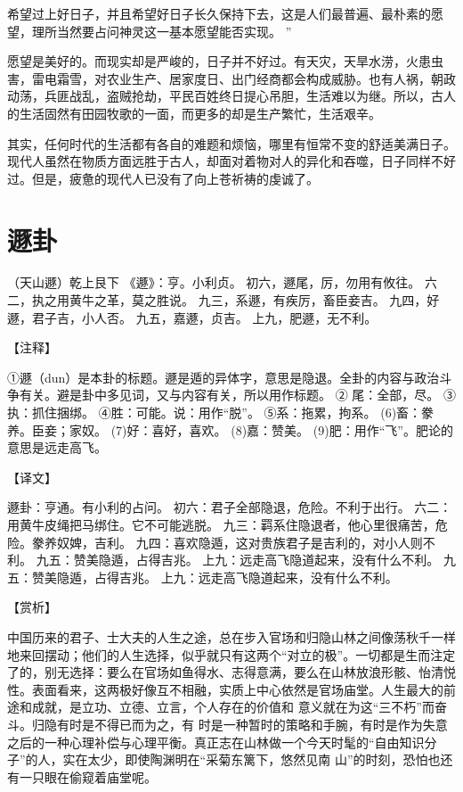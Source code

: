 \documentclass[12pt,UTF8]{ctexbook}
\begin{document}
希望过上好日子，并且希望好日子长久保持下去，这是人们最普遍、最朴素的愿望，理所当然要占问神灵这一基本愿望能否实现。 ”

愿望是美好的。而现实却是严峻的，日子并不好过。有天灾，天旱水涝，火患虫害，雷电霜雪，对农业生产、居家度日、出门经商都会构成威胁。也有人祸，朝政动荡，兵匪战乱，盗贼抢劫，平民百姓终日提心吊胆，生活难以为继。所以，古人的生活固然有田园牧歌的一面，而更多的却是生产繁忙，生活艰辛。

其实，任何时代的生活都有各自的难题和烦恼，哪里有恒常不变的舒适美满日子。现代人虽然在物质方面远胜于古人，却面对着物对人的异化和吞噬，日子同样不好过。但是，疲惫的现代人已没有了向上苍祈祷的虔诚了。

\chapter{遯卦}

（天山遯）乾上艮下
《遯》：亨。小利贞。
初六，遯尾，厉，勿用有攸往。
六二，执之用黄牛之革，莫之胜说。
九三，系遯，有疾厉，畜臣妾吉。
九四，好遯，君子吉，小人否。
九五，嘉遯，贞吉。
上九，肥遯，无不利。

【注释】

①遯（dun）是本卦的标题。遯是遁的异体字，意思是隐退。全卦的内容与政治斗争有关。避是卦中多见词，又与内容有关，所以用作标题。
② 尾：全部，尽。
③执：抓住捆绑。
④胜：可能。说：用作“脱”。
⑤系：拖累，拘系。
(6)畜：豢养。臣妾；家奴。
(7)好：喜好，喜欢。
(8)嘉：赞美。
(9)肥：用作“飞”。肥论的意思是远走高飞。

【译文】

遯卦：亨通。有小利的占问。
初六：君子全部隐退，危险。不利于出行。
六二：用黄牛皮绳把马绑住。它不可能逃脱。
九三：羁系住隐退者，他心里很痛苦，危险。豢养奴婢，吉利。
九四：喜欢隐遁，这对贵族君子是吉利的，对小人则不利。
九五：赞美隐遁，占得吉兆。
上九：远走高飞隐道起来，没有什么不利。
九五：赞美隐遁，占得吉兆。
上九：远走高飞隐道起来，没有什么不利。

【赏析】

中国历来的君子、士大夫的人生之途，总在步入官场和归隐山林之间像荡秋千一样地来回摆动；他们的人生选择，似乎就只有这两个“对立的极”。一切都是生而注定了的，别无选择：要么在官场如鱼得水、志得意满，要么在山林放浪形骸、怡清悦性。表面看来，这两极好像互不相融，实质上中心依然是官场庙堂。人生最大的前途和成就，是立功、立德、立言，个人存在的价值和 意义就在为这“三不朽”而奋斗。归隐有时是不得已而为之，有 时是一种暂时的策略和手腕，有时是作为失意之后的一种心理补偿与心理平衡。真正志在山林做一个今天时髦的“自由知识分 子”的人，实在太少，即使陶渊明在“采菊东篱下，悠然见南 山”的时刻，恐怕也还有一只眼在偷窥着庙堂呢。
\end{document}
